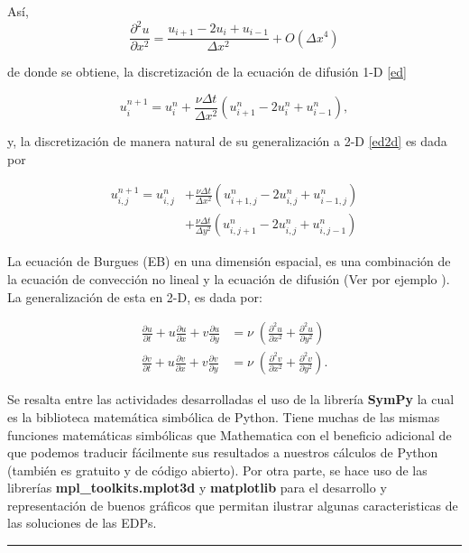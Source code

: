 \documentclass[A4,11pt]{article}
\begin{document}
\begin{multicols}{2}
Así, 
$$\frac{\partial ^2 u}{\partial x^2}=\frac{u_{i+1}-2u_{i}+u_{i-1}}{\Delta x^2} + O(\Delta x^4)$$

de donde se obtiene, la discretización de la ecuación de difusión 1-D \ref{ed}
\begin{tiny}
\begin{equation}
	\label{ded}
	u_{i}^{n+1}=u_{i}^{n}+\frac{\nu\Delta t}{\Delta x^2}(u_{i+1}^{n}-2u_{i}^{n}+u_{i-1}^{n}),	
\end{equation}	
\end{tiny}

y, la discretización de manera natural de su generalización a 2-D \ref{ed2d} es dada por 
\begin{tiny}
\begin{equation}
	\label{ded2d}
	\begin{split}
		u_{i,j}^{n+1} = u_{i,j}^n &+ \frac{\nu \Delta t}{\Delta x^2}(u_{i+1,j}^n - 2 u_{i,j}^n + u_{i-1,j}^n) \\
		&+ \frac{\nu \Delta t}{\Delta y^2}(u_{i,j+1}^n-2 u_{i,j}^n + u_{i,j-1}^n)
	\end{split}	
\end{equation}	
\end{tiny}

La ecuación de Burgues (EB) en una dimensión espacial, es una combinación de la ecuación de convección no lineal y la ecuación de difusión (Ver por ejemplo \cite{LeonardoED}). La generalización de esta en 2-D, es dada por:

\begin{equation}
	\label{eb2d}
	\begin{split}
		\frac{\partial u}{\partial t} + u \frac{\partial u}{\partial x} + v \frac{\partial u}{\partial y} &= \nu \; \left(\frac{\partial ^2 u}{\partial x^2} + \frac{\partial ^2 u}{\partial y^2}\right)\\
		\frac{\partial v}{\partial t} + u \frac{\partial v}{\partial x} + v \frac{\partial v}{\partial y} &= \nu \; \left(\frac{\partial ^2 v}{\partial x^2} + \frac{\partial ^2 v}{\partial y^2}\right).
	\end{split}
\end{equation}

Se resalta entre las actividades desarrolladas el uso de la librería \textbf{SymPy} la cual es la biblioteca matemática simbólica de Python. Tiene muchas de las mismas funciones matemáticas simbólicas que Mathematica con el beneficio adicional de que podemos traducir fácilmente sus resultados a nuestros cálculos de Python (también es gratuito y de código abierto). Por otra parte, se hace uso de las librerías \textbf{mpl\_toolkits.mplot3d} y \textbf{matplotlib} para el desarrollo y representación de buenos gráficos que permitan ilustrar algunas caracteristicas de las soluciones de las EDPs.  
\end{multicols}
\begin{center}\rule{0.9\textwidth}{0.1mm}
\end{center}
\end{document}
